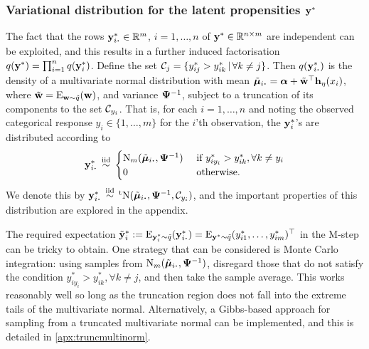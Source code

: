 \subsubsection{Variational distribution for the latent propensities \texorpdfstring{${\mathbf y}^*$}{$y^*$}}

The fact that the rows $\by_{i \bigcdot}^* \in \bbR^m$, $i=1,\dots,n$ of ${\mathbf y}^* \in \mathbb{R}^{n \times m}$ are independent can be exploited, and this results in a further induced factorisation $q({\mathbf y}^*) = \prod_{i=1}^n q({\mathbf y}_i^*)$.
Define the set ${\mathcal C}_j = \{y_{ij}^* > y_{ik}^* \,|\, \forall k\neq j \}$.
Then $q(\by_{i \bigcdot}^*)$ is the density of a multivariate normal distribution with mean $\tilde \bmu_{i \bigcdot} = \balpha + \tilde\bw^\top  \bh_\eta(x_i)$, where $\tilde {{\mathbf w}} = \operatorname{E}_{{\mathbf w}\sim\tilde q}({\mathbf w})$, and variance ${\bm\Psi}^{-1}$, subject to a truncation of its components to the set ${\mathcal C}_{y_i}$.
That is, for each $i=1,\dots,n$ and noting the observed categorical response $y_i \in \{1,\dots,m\}$ for the $i$'th observation, the ${\mathbf y}_i^*$'s are distributed according to
\begin{align}\label{eq:ystardist}
  \by_{i \bigcdot}^* \iid
  \begin{cases}
    \N_m(\tilde\bmu_{i \bigcdot},  \bPsi^{-1}) & \text{ if } y_{iy_i}^* > y_{ik}^*, \forall k \neq y_i \\
    0 & \text{ otherwise}. \\
  \end{cases}
\end{align}
We denote this by $\by_{i \bigcdot}^* \iid \tN(\tilde\bmu_{i \bigcdot}, \bPsi^{-1},\cC_{y_i})$, and the important properties of this distribution are explored in the appendix.

The required expectation $\tilde\by^*_i := \E_{\by^*_i\sim\tilde q} (\by^*_{i\bigcdot}) = \E_{\by^*\sim\tilde q} (y_{i1}^*,\dots, y_{im}^*)^\top$ in the M-step can be tricky to obtain.
One strategy that can be considered is Monte Carlo integration: using samples from $\N_m(\tilde\bmu_{i \bigcdot},  \bPsi^{-1})$, disregard those that do not satisfy the condition $y_{iy_i}^* > y_{ik}^*, \forall k \neq j$, and then take the sample average.
This works reasonably well so long as the truncation region does not fall into the extreme tails of the multivariate normal.
Alternatively, a Gibbs-based approach \citep{robert1995simulation} for sampling from a truncated multivariate normal can be implemented, and this is detailed in \cref{apx:truncmultinorm}.

